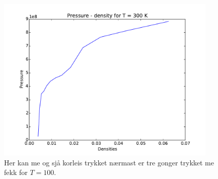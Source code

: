 \documentclass[12pt, a4paper]{article}
\theoremstyle{definition} \newtheorem*{definition}{Teorem}
\begin{document}
            \begin{figure}[H]
                \centering
                \includegraphics[width=400px]{PD300.pdf}
                \caption{Her kan me og sjå korleis trykket nærmast er tre gonger trykket me fekk for $T = 100$.}
            \end{figure}
\end{document}
